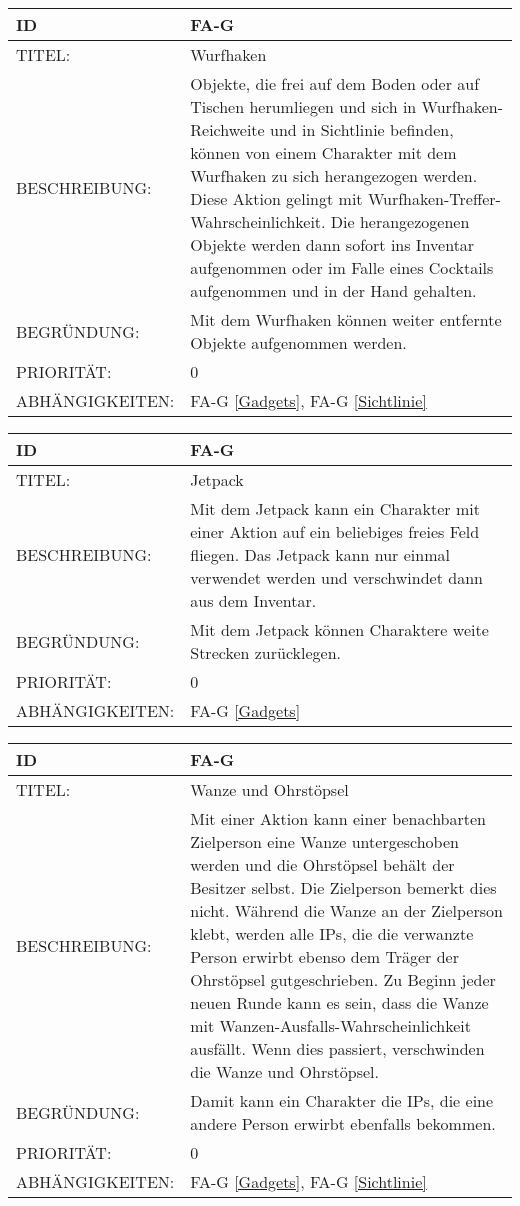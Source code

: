 \begin{tabularx}{16cm}{l|X}
	{table}\label{Wurfhaken}
	\textbf{ID} & \textbf{FA-G \arabic{table}} \\
	\hline
	TITEL: & Wurfhaken \\
	\hline
	BESCHREIBUNG: & Objekte, die frei auf dem Boden oder auf Tischen herumliegen und sich in Wurfhaken-Reichweite und in Sichtlinie befinden, können von einem Charakter mit dem Wurfhaken zu sich herangezogen werden. Diese Aktion gelingt mit Wurfhaken-Treffer-Wahrscheinlichkeit. Die herangezogenen Objekte werden dann sofort ins Inventar aufgenommen oder im Falle eines Cocktails aufgenommen und in der Hand gehalten. \\
	\hline
	BEGRÜNDUNG: &  Mit dem Wurfhaken können weiter entfernte Objekte aufgenommen werden. \\
	\hline
	PRIORITÄT: & 0\\
	\hline
	ABHÄNGIGKEITEN: & FA-G \ref{Gadgets}, FA-G \ref{Sichtlinie} \\
\end{tabularx}

\begin{tabularx}{16cm}{l|X}
	{table}\label{Jetpack}
	\textbf{ID} & \textbf{FA-G \arabic{table}} \\
	\hline
	TITEL: & Jetpack \\
	\hline
	BESCHREIBUNG: & Mit dem Jetpack kann ein Charakter mit einer Aktion auf ein beliebiges freies Feld fliegen. Das Jetpack kann nur einmal verwendet werden und verschwindet dann aus dem Inventar. \\
	\hline
	BEGRÜNDUNG: &  Mit dem Jetpack können Charaktere weite Strecken zurücklegen. \\
	\hline
	PRIORITÄT: & 0\\
	\hline
	ABHÄNGIGKEITEN: & FA-G \ref{Gadgets} \\
\end{tabularx}

\begin{tabularx}{16cm}{l|X}
	{table}\label{Wanze und Ohrstoepsel}
	\textbf{ID} & \textbf{FA-G \arabic{table}} \\
	\hline
	TITEL: & Wanze und Ohrstöpsel \\
	\hline
	BESCHREIBUNG: & Mit einer Aktion kann einer benachbarten Zielperson eine Wanze untergeschoben werden und die Ohrstöpsel behält der Besitzer selbst. Die Zielperson bemerkt dies nicht. Während die Wanze an der Zielperson klebt, werden alle IPs, die die verwanzte Person erwirbt ebenso dem Träger der Ohrstöpsel gutgeschrieben. Zu Beginn jeder neuen Runde kann es sein, dass die Wanze mit Wanzen-Ausfalls-Wahrscheinlichkeit ausfällt. Wenn dies passiert, verschwinden die Wanze und Ohrstöpsel. \\
	\hline
	BEGRÜNDUNG: &  Damit kann ein Charakter die IPs, die eine andere Person erwirbt ebenfalls bekommen. \\
	\hline
	PRIORITÄT: & 0\\
	\hline
	ABHÄNGIGKEITEN: & FA-G \ref{Gadgets}, FA-G \ref{Sichtlinie} \\
\end{tabularx}

